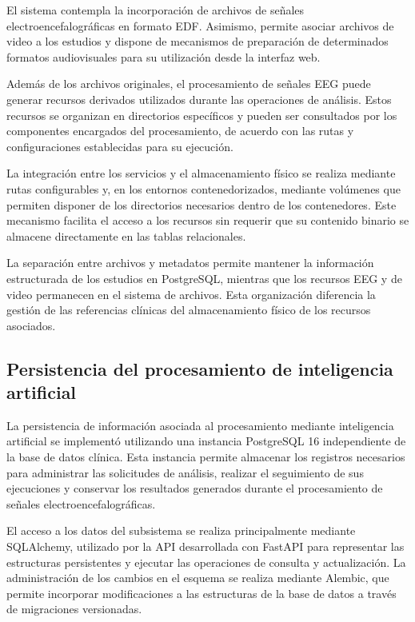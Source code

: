 El sistema contempla la incorporación de archivos
de señales electroencefalográficas en formato EDF. Asimismo, permite asociar
archivos de video a los estudios y dispone de
mecanismos de preparación de determinados formatos
audiovisuales para su utilización desde la
interfaz web.


Además de los archivos originales, el procesamiento de
señales EEG puede generar recursos derivados utilizados
durante las operaciones de análisis. Estos recursos se
organizan en directorios específicos y pueden ser
consultados por los componentes encargados del
procesamiento, de acuerdo con las rutas y configuraciones
establecidas para su ejecución.


La integración entre los servicios y el
almacenamiento físico se realiza mediante rutas
configurables y, en los entornos contenedorizados,
mediante volúmenes que permiten disponer de los
directorios necesarios dentro de los contenedores.
Este mecanismo facilita el acceso a los recursos
sin requerir que su contenido binario se almacene
directamente en las tablas relacionales.


La separación entre archivos y metadatos permite
mantener la información estructurada de los estudios
en PostgreSQL, mientras que los recursos EEG y de
video permanecen en el sistema de archivos.
Esta organización diferencia la gestión de las
referencias clínicas del almacenamiento físico
de los recursos asociados.


\subsection[Persistencia del procesamiento de inteligencia \\artificial]{Persistencia del procesamiento de inteligencia \\artificial}

La persistencia de información asociada al procesamiento
mediante inteligencia artificial se implementó utilizando
una instancia PostgreSQL 16 independiente de la base de
datos clínica. Esta instancia permite almacenar los
registros necesarios para administrar las solicitudes
de análisis, realizar el seguimiento de sus ejecuciones
y conservar los resultados generados durante el
procesamiento de señales electroencefalográficas.

El acceso a los datos del subsistema se realiza
principalmente mediante SQLAlchemy, utilizado por
la API desarrollada con FastAPI para representar
las estructuras persistentes y ejecutar las
operaciones de consulta y actualización. La
administración de los cambios en el esquema se
realiza mediante Alembic, que permite incorporar
modificaciones a las estructuras de la base de
datos a través de migraciones versionadas.


